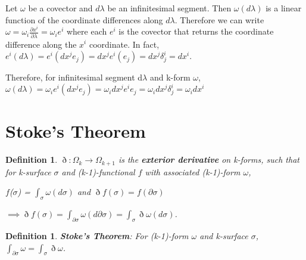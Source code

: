 \documentclass{book}
\newtheorem{defn}[equation]{Definition}
\begin{document}
Let $\omega$ be a covector and $d\lambda$ be an infinitesimal segment. Then $\omega(d\lambda)$ is a linear function of the coordinate differences along $d\lambda$. Therefore we can write $\omega = \omega_i \frac{\partial x^i}{\partial \lambda} = \omega_i e^i$ where each $e^i$ is the covector that returns the coordinate difference along the $x^i$ coordinate. In fact, $e^i(d\lambda) = e^i(dx^j e_j) = dx^j e^i(e_j) = dx^j \delta^i_j = dx^i$.


Therefore, for infinitesimal segment d$\lambda$ and k-form $\omega$, $\omega(d\lambda) = \omega_ie^i(dx^je_j) = \omega_idx^je^ie_j = \omega_idx^j\delta^i_j = \omega_i dx^i$ 

\section{Stoke's Theorem}



\begin{defn}
	$\eth : \Omega_k \to \Omega_{k+1}$ is the \textbf{exterior derivative} on k-forms, such that for k-surface $\sigma$ and (k-1)-functional $f$ with associated (k-1)-form $\omega$, 
	
	$f$($\sigma$) = $\int_{\sigma}\omega(d\sigma)$ and $\eth f(\sigma) = f(\partial\sigma)$
	
	$\implies \eth f(\sigma) = \int_{\partial\sigma} \omega(d\partial\sigma) = \int_{\sigma} \eth\omega(d\sigma)$. 
\end{defn}




 



\begin{defn}
	\textbf{Stoke's Theorem}: For (k-1)-form $\omega$ and k-surface $\sigma$, $\int_{\partial \sigma}\omega = \int_{\sigma}\eth\omega$. 
\end{defn}
\end{document}
